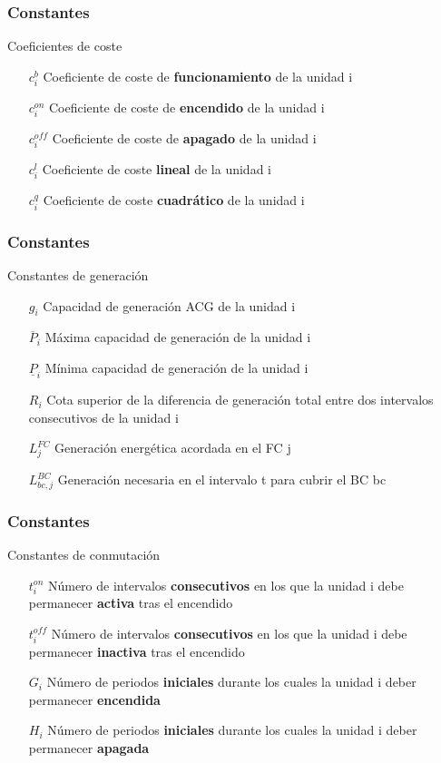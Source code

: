 \documentclass[xcolor=dvipsnames, utf8, spanish]{beamer} %
\begin{document}
\begin{frame}
	\frametitle{Constantes}
	\begin{block} {Coeficientes de coste}
		\begin{itemize}
			\item [$c^{b}_i$] Coeficiente de coste de \textbf{funcionamiento} de la unidad i
			\item [$c^{on}_i$] Coeficiente de coste de \textbf{encendido} de la unidad i
			\item [$c^{off}_i$] Coeficiente de coste de \textbf{apagado} de la unidad i
			\item [$c^{l}_i$] Coeficiente de coste \textbf{lineal} de la unidad i
			\item [$c^{q}_i$] Coeficiente de coste \textbf{cuadrático} de la unidad i
		\end{itemize}
	\end{block}
\end{frame}



\begin{frame}
	\frametitle{Constantes}
	\begin{block} {Constantes de generación}
		\begin{itemize}
			\item [$g_i$] Capacidad de generación ACG de la unidad i
			\item [$\overline{P}_i$] Máxima capacidad de generación de la unidad i
			\item [$\underline{P}_i$] Mínima capacidad de generación de la unidad i
			\item [$R_i$] Cota superior de la diferencia de generación total entre dos intervalos consecutivos de la unidad i
			\item [$L^{FC}_j$] Generación energética acordada en el FC j
			\item [$L^{BC}_{bc,j}$] Generación necesaria en el intervalo t para cubrir el BC bc
		\end{itemize}
	\end{block}
\end{frame}

\begin{frame}
	\frametitle{Constantes}
	\begin{block} {Constantes de conmutación}
		\begin{itemize}
			\item [$t^{on}_i$] Número de intervalos \textbf{consecutivos} en los que la unidad i debe permanecer 	\textbf{activa} tras el encendido
			\item [$t^{off}_i$] Número de intervalos \textbf{consecutivos} en los que la unidad i debe permanecer 	\textbf{inactiva} tras el encendido
			\item [$G_i$] Número de periodos \textbf{iniciales} durante los cuales la unidad i deber permanecer 	\textbf{encendida}
			\item [$H_i$] Número de periodos \textbf{iniciales} durante los cuales la unidad i deber permanecer 	\textbf{apagada}
		\end{itemize}
	\end{block}
\end{frame}
\end{document}
